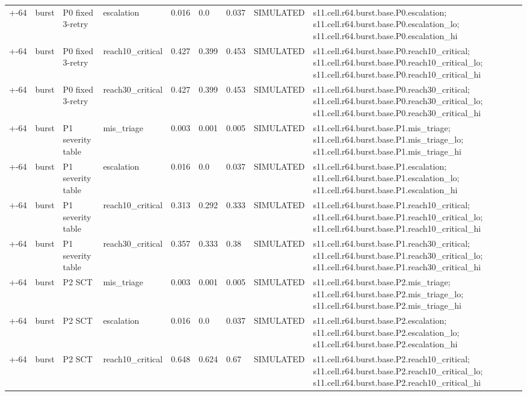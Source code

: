 \begin{table}[t]
\begin{tabular}{lllllllll}
+-64 & burst & P0 fixed 3-retry & escalation & 0.016 & 0.0 & 0.037 & SIMULATED & s11.cell.r64.burst.base.P0.escalation; s11.cell.r64.burst.base.P0.escalation\_lo; s11.cell.r64.burst.base.P0.escalation\_hi \\
+-64 & burst & P0 fixed 3-retry & reach10\_critical & 0.427 & 0.399 & 0.453 & SIMULATED & s11.cell.r64.burst.base.P0.reach10\_critical; s11.cell.r64.burst.base.P0.reach10\_critical\_lo; s11.cell.r64.burst.base.P0.reach10\_critical\_hi \\
+-64 & burst & P0 fixed 3-retry & reach30\_critical & 0.427 & 0.399 & 0.453 & SIMULATED & s11.cell.r64.burst.base.P0.reach30\_critical; s11.cell.r64.burst.base.P0.reach30\_critical\_lo; s11.cell.r64.burst.base.P0.reach30\_critical\_hi \\
+-64 & burst & P1 severity table & mis\_triage & 0.003 & 0.001 & 0.005 & SIMULATED & s11.cell.r64.burst.base.P1.mis\_triage; s11.cell.r64.burst.base.P1.mis\_triage\_lo; s11.cell.r64.burst.base.P1.mis\_triage\_hi \\
+-64 & burst & P1 severity table & escalation & 0.016 & 0.0 & 0.037 & SIMULATED & s11.cell.r64.burst.base.P1.escalation; s11.cell.r64.burst.base.P1.escalation\_lo; s11.cell.r64.burst.base.P1.escalation\_hi \\
+-64 & burst & P1 severity table & reach10\_critical & 0.313 & 0.292 & 0.333 & SIMULATED & s11.cell.r64.burst.base.P1.reach10\_critical; s11.cell.r64.burst.base.P1.reach10\_critical\_lo; s11.cell.r64.burst.base.P1.reach10\_critical\_hi \\
+-64 & burst & P1 severity table & reach30\_critical & 0.357 & 0.333 & 0.38 & SIMULATED & s11.cell.r64.burst.base.P1.reach30\_critical; s11.cell.r64.burst.base.P1.reach30\_critical\_lo; s11.cell.r64.burst.base.P1.reach30\_critical\_hi \\
+-64 & burst & P2 SCT & mis\_triage & 0.003 & 0.001 & 0.005 & SIMULATED & s11.cell.r64.burst.base.P2.mis\_triage; s11.cell.r64.burst.base.P2.mis\_triage\_lo; s11.cell.r64.burst.base.P2.mis\_triage\_hi \\
+-64 & burst & P2 SCT & escalation & 0.016 & 0.0 & 0.037 & SIMULATED & s11.cell.r64.burst.base.P2.escalation; s11.cell.r64.burst.base.P2.escalation\_lo; s11.cell.r64.burst.base.P2.escalation\_hi \\
+-64 & burst & P2 SCT & reach10\_critical & 0.648 & 0.624 & 0.67 & SIMULATED & s11.cell.r64.burst.base.P2.reach10\_critical; s11.cell.r64.burst.base.P2.reach10\_critical\_lo; s11.cell.r64.burst.base.P2.reach10\_critical\_hi \\

\end{tabular}
\end{table}
